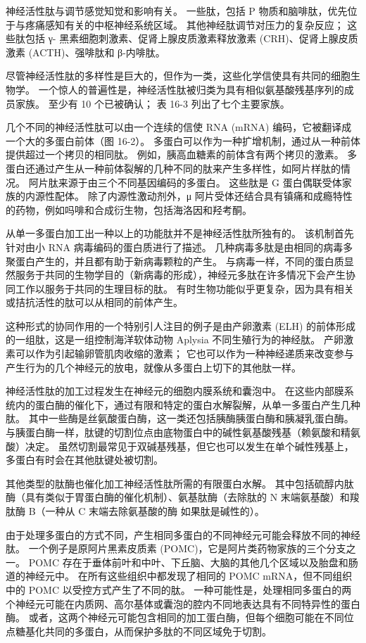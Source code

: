 神经活性肽与调节感觉知觉和影响有关。 一些肽，包括 P 物质和脑啡肽，优先位于与疼痛感知有关的中枢神经系统区域。 其他神经肽调节对压力的复杂反应； 这些肽包括 γ- 黑素细胞刺激素、促肾上腺皮质激素释放激素 (CRH)、促肾上腺皮质激素 (ACTH)、强啡肽和 β-内啡肽。

尽管神经活性肽的多样性是巨大的，但作为一类，这些化学信使具有共同的细胞生物学。 一个惊人的普遍性是，神经活性肽被归类为具有相似氨基酸残基序列的成员家族。 至少有 10 个已被确认； 表 16-3 列出了七个主要家族。

几个不同的神经活性肽可以由一个连续的信使 RNA (mRNA) 编码，它被翻译成一个大的多蛋白前体（图 16-2）。 多蛋白可以作为一种扩增机制，通过从一种前体提供超过一个拷贝的相同肽。 例如，胰高血糖素的前体含有两个拷贝的激素。 多蛋白还通过产生从一种前体裂解的几种不同的肽来产生多样性，如阿片样肽的情况。 阿片肽来源于由三个不同基因编码的多蛋白。 这些肽是 G 蛋白偶联受体家族的内源性配体。 除了内源性激动剂外，μ 阿片受体还结合具有镇痛和成瘾特性的药物，例如吗啡和合成衍生物，包括海洛因和羟考酮。

从单一多蛋白加工出一种以上的功能肽并不是神经活性肽所独有的。 该机制首先针对由小 RNA 病毒编码的蛋白质进行了描述。 几种病毒多肽是由相同的病毒多聚蛋白产生的，并且都有助于新病毒颗粒的产生。 与病毒一样，不同的蛋白质显然服务于共同的生物学目的（新病毒的形成），神经元多肽在许多情况下会产生协同工作以服务于共同的生理目标的肽。 有时生物功能似乎更复杂，因为具有相关或拮抗活性的肽可以从相同的前体产生。

这种形式的协同作用的一个特别引人注目的例子是由产卵激素 (ELH) 的前体形成的一组肽，这是一组控制海洋软体动物 Aplysia 不同生殖行为的神经肽。 产卵激素可以作为引起输卵管肌肉收缩的激素； 它也可以作为一种神经递质来改变参与产生行为的几个神经元的放电，就像从多蛋白上切下的其他肽一样。

神经活性肽的加工过程发生在神经元的细胞内膜系统和囊泡中。 在这些内部膜系统内的蛋白酶的催化下，通过有限和特定的蛋白水解裂解，从单一多蛋白产生几种肽。 其中一些酶是丝氨酸蛋白酶，这一类还包括胰酶胰蛋白酶和胰凝乳蛋白酶。 与胰蛋白酶一样，肽键的切割位点由底物蛋白中的碱性氨基酸残基（赖氨酸和精氨酸）决定。 虽然切割最常见于双碱基残基，但它也可以发生在单个碱性残基上，多蛋白有时会在其他肽键处被切割。

其他类型的肽酶也催化加工神经活性肽所需的有限蛋白水解。 其中包括硫醇内肽酶（具有类似于胃蛋白酶的催化机制）、氨基肽酶（去除肽的 N 末端氨基酸）和羧肽酶 B（一种从 C 末端去除氨基酸的酶 如果肽是碱性的）。

由于处理多蛋白的方式不同，产生相同多蛋白的不同神经元可能会释放不同的神经肽。 一个例子是原阿片黑素皮质素 (POMC)，它是阿片类药物家族的三个分支之一。 POMC 存在于垂体前叶和中叶、下丘脑、大脑的其他几个区域以及胎盘和肠道的神经元中。 在所有这些组织中都发现了相同的 POMC mRNA，但不同组织中的 POMC 以受控方式产生了不同的肽。 一种可能性是，处理相同多蛋白的两个神经元可能在内质网、高尔基体或囊泡的腔内不同地表达具有不同特异性的蛋白酶。 或者，这两个神经元可能包含相同的加工蛋白酶，但每个细胞可能在不同位点糖基化共同的多蛋白，从而保护多肽的不同区域免于切割。


